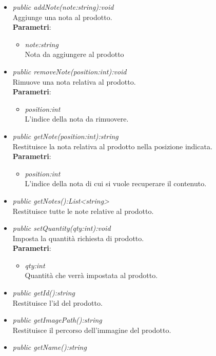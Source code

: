 \begin{itemize}
\begin{itemize}
	\item \textit{public addNote(note:string):void}\\
	Aggiunge una nota al prodotto.
				\\ \textbf{Parametri}: \begin{itemize}
				\item \textit{note:string}\\
				Nota da aggiungere al prodotto
			\end{itemize} 
	\item \textit{public removeNote(position:int):void}\\
	Rimuove una nota relativa al prodotto.
				\\ \textbf{Parametri}: \begin{itemize}
				\item \textit{position:int}\\
				L'indice della nota da rimuovere.
			\end{itemize} 
	\item \textit{public getNote(position:int):string}\\
	Restituisce la nota relativa al prodotto nella posizione indicata.
				\\ \textbf{Parametri}: \begin{itemize}
				\item \textit{position:int}\\
				L'indice della nota di cui si vuole recuperare il contenuto.
			\end{itemize} 
	\item \textit{public getNotes():List<string>}\\
	Restituisce tutte le note relative al prodotto.
	\item \textit{public setQuantity(qty:int):void}\\
	Imposta la quantità richiesta di prodotto.
				\\ \textbf{Parametri}: \begin{itemize}
				\item \textit{qty:int}\\
				Quantità che verrà impostata al prodotto.
			\end{itemize} 
	\item \textit{public getId():string}\\
	Restituisce l'id del prodotto.
	\item \textit{public getImagePath():string}\\
	Restituisce il percorso dell'immagine del prodotto.
	\item \textit{public getName():string}\\

\end{itemize}
\end{itemize}
